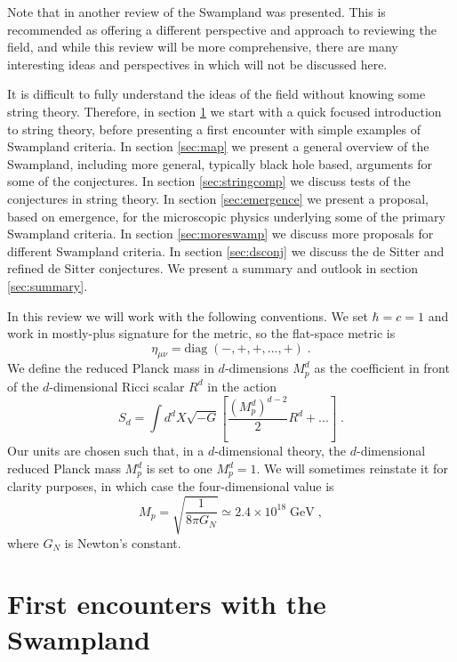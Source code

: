 \documentclass[11pt,a4paper]{article}
\numberwithin{equation}{section}
\numberwithin{table}{section}\setlength{\multlinegap}{25pt}
\newcommand{\be}{\begin{equation}}
\newcommand{\ee}{\end{equation}}
\begin{document}
Note that in \cite{Brennan:2017rbf} another review of the Swampland was presented. This is recommended as offering a different perspective and approach to reviewing the field, and while this review will be more comprehensive, there are many interesting ideas and perspectives in \cite{Brennan:2017rbf} which will not be discussed here. 

It is difficult to fully understand the ideas of the field without knowing some string theory. Therefore, in section \ref{sec:first} we start with a quick focused introduction to string theory, before presenting a first encounter with simple examples of Swampland criteria. In section \ref{sec:map} we present a general overview of the Swampland, including more general, typically black hole based, arguments for some of the conjectures. In section \ref{sec:stringcomp} we discuss tests of the conjectures in string theory. In section \ref{sec:emergence} we present a proposal, based on emergence, for the microscopic physics underlying some of the primary Swampland criteria. In section \ref{sec:moreswamp} we discuss more proposals for different Swampland criteria. In section \ref{sec:dsconj} we discuss the de Sitter and refined de Sitter conjectures. We present a summary and outlook in section \ref{sec:summary}.

In this review we will work with the following conventions. We set $\hbar=c=1$ and work in mostly-plus signature for the metric, so the flat-space metric is
\be
\eta_{\mu\nu} = \mathrm{diag\;} \left( -,+,+,...,+\right) \;.
\ee
We define the reduced Planck mass in $d$-dimensions $M_p^d$ as the coefficient in front of the $d$-dimensional Ricci scalar $R^d$ in the action
\be
S_d = \int d^dX \sqrt{-G} \left[ \frac{\left(M^d_p\right)^{d-2}}{2} R^d+ ... \right] \;.
\ee 
Our units are chosen such that, in a $d$-dimensional theory, the $d$-dimensional reduced Planck mass $M_p^d$ is set to one $M^d_p=1$. We will sometimes reinstate it for clarity purposes, in which case the four-dimensional value is 
\be
M_p = \sqrt{\frac{1}{8 \pi G_N}} \simeq 2.4 \times 10^{18} \;\mathrm{GeV} \;,
\ee
where $G_N$ is Newton's constant.

\section{First encounters with the Swampland}
\label{sec:first}
\end{document}
